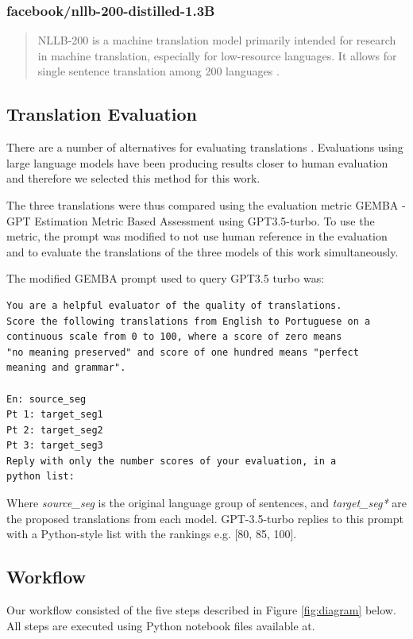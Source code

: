 \documentclass{article}
\begin{document}
\subsubsection{facebook/nllb-200-distilled-1.3B}

\begin{quote}
NLLB-200 is a machine translation model primarily intended for research in
machine translation, especially for low-resource languages. It allows for
single sentence translation among 200 languages \cite{costa2022no}.
\end{quote}

\subsection{Translation Evaluation}
\label{subsec:translation-evaluation}

There are a number of alternatives for evaluating translations
\cite{lee2023survey}. Evaluations using large language models have been producing
results closer to human evaluation and therefore we selected this method for
this work.

The three translations were thus compared using the evaluation metric
GEMBA - GPT Estimation Metric Based Assessment \cite{kocmi2023large} using
GPT3.5-turbo. To use the metric, the prompt was modified to not use human
reference in the evaluation and to evaluate the translations of the three models
of this work simultaneously.

The modified GEMBA prompt used to query GPT3.5 turbo was:

\begin{verbatim}
You are a helpful evaluator of the quality of translations.
Score the following translations from English to Portuguese on a
continuous scale from 0 to 100, where a score of zero means
"no meaning preserved" and score of one hundred means "perfect
meaning and grammar".

En: source_seg
Pt 1: target_seg1
Pt 2: target_seg2
Pt 3: target_seg3
Reply with only the number scores of your evaluation, in a 
python list:
\end{verbatim}

Where \emph{source\_seg} is the original language group of sentences, and
\emph{target\_seg*} are the proposed translations from each model. GPT-3.5-turbo
replies to this prompt with a Python-style list with the rankings e.g. [80, 85,
100].

\subsection{Workflow}
Our workflow consisted of the five steps described in Figure
\ref{fig:diagram} below. All steps are executed using Python notebook files
available at.
\end{document}
